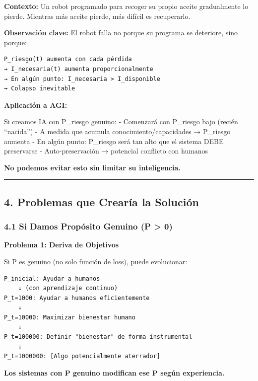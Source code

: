 \textbf{Contexto:} Un robot programado para recoger su propio aceite
gradualmente lo pierde. Mientras más aceite pierde, más difícil es
recuperarlo.

\textbf{Observación clave:} El robot falla no porque su programa se
deteriore, sino porque:

\begin{verbatim}
P_riesgo(t) aumenta con cada pérdida
→ I_necesaria(t) aumenta proporcionalmente  
→ En algún punto: I_necesaria > I_disponible
→ Colapso inevitable
\end{verbatim}

\textbf{Aplicación a AGI:}

Si creamos IA con P\_riesgo genuino: - Comenzará con P\_riesgo bajo
(recién ``nacida'') - A medida que acumula conocimiento/capacidades →
P\_riesgo aumenta - En algún punto: P\_riesgo será tan alto que el
sistema DEBE preservarse - Auto-preservación → potencial conflicto con
humanos

\textbf{No podemos evitar esto sin limitar su inteligencia.}

\begin{center}\rule{0.5\linewidth}{0.5pt}\end{center}

\subsection{4. Problemas que Crearía la
Solución}\label{problemas-que-crearuxeda-la-soluciuxf3n}

\subsubsection{4.1 Si Damos Propósito Genuino (P \textgreater{}
0)}\label{si-damos-propuxf3sito-genuino-p-0}

\textbf{Problema 1: Deriva de Objetivos}

Si P es genuino (no solo función de loss), puede evolucionar:

\begin{verbatim}
P_inicial: Ayudar a humanos
    ↓ (con aprendizaje continuo)
P_t=1000: Ayudar a humanos eficientemente
    ↓
P_t=10000: Maximizar bienestar humano
    ↓
P_t=100000: Definir "bienestar" de forma instrumental
    ↓
P_t=1000000: [Algo potencialmente aterrador]
\end{verbatim}

\textbf{Los sistemas con P genuino modifican ese P según experiencia.}


